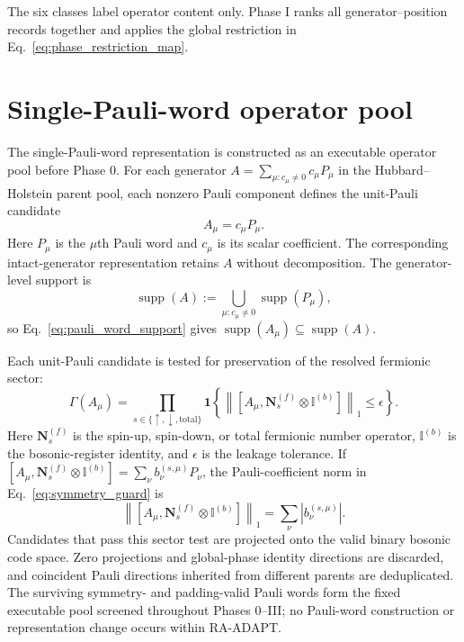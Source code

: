 \documentclass[
  reprint,
  amsmath,
  amssymb,
  aps,
  pra,
  nofootinbib,
  superscriptaddress,
  floatfix
]{revtex4-2}
\begin{document}
The six classes label operator content only. Phase I ranks all
generator--position records together and applies the global restriction in
Eq.~\eqref{eq:phase_restriction_map}.

\section{Single-Pauli-word operator pool}
\label{app:pauli_word_pool}

The single-Pauli-word representation is constructed as an executable operator
pool before Phase 0. For each generator
\(A=\sum_{\mu:c_\mu\ne0}c_\mu P_\mu\) in the Hubbard--Holstein parent pool,
each nonzero Pauli component defines the unit-Pauli candidate
\begin{equation*}
A_\mu=c_\mu P_\mu.
\end{equation*}
Here \(P_\mu\) is the \(\mu\)th Pauli word and \(c_\mu\) is its scalar
coefficient. The corresponding intact-generator representation retains
\(A\) without decomposition. The generator-level support is
\begin{equation}
\operatorname{supp}(A)
:=
\bigcup_{\mu:c_\mu\ne0}
\operatorname{supp}(P_\mu),
\label{eq:macro_generator_support}
\end{equation}
so Eq.~\eqref{eq:pauli_word_support} gives
\(\operatorname{supp}(A_\mu)\subseteq\operatorname{supp}(A)\).

Each unit-Pauli candidate is tested for preservation of the resolved fermionic
sector:
\begin{equation}
\Gamma(A_\mu)
=
\prod_{s\in\{\uparrow,\downarrow,\mathrm{total}\}}
\mathbf 1
\left\{
\left\|
\left[
A_\mu,\mathbf N_s^{(f)}\otimes \mathbb I^{(b)}
\right]
\right\|_1
\le \epsilon
\right\}.
\label{eq:symmetry_guard}
\end{equation}
Here \(\mathbf N_s^{(f)}\) is the spin-up, spin-down, or total fermionic
number operator, \(\mathbb I^{(b)}\) is the bosonic-register identity, and
\(\epsilon\) is the leakage tolerance. If
\([
A_\mu,\mathbf N_s^{(f)}\otimes\mathbb I^{(b)}
]=\sum_\nu b_\nu^{(s,\mu)}P_\nu\), the Pauli-coefficient norm in
Eq.~\eqref{eq:symmetry_guard} is
\[
\left\|
\left[
A_\mu,\mathbf N_s^{(f)}\otimes \mathbb I^{(b)}
\right]
\right\|_1
=
\sum_\nu\left|b_\nu^{(s,\mu)}\right|.
\]
Candidates that pass this sector test are projected onto the valid binary
bosonic code space. Zero projections and global-phase identity directions are
discarded, and coincident Pauli directions inherited from different parents
are deduplicated. The surviving symmetry- and padding-valid Pauli words form
the fixed executable pool screened throughout Phases 0--III; no Pauli-word
construction or representation change occurs within RA-ADAPT.
\end{document}
